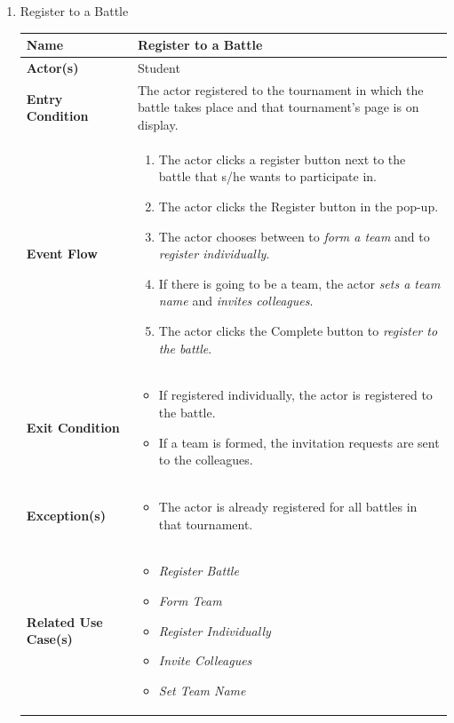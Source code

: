 \begin{enumerate}
\item Register to a Battle
\begin{center}
    \begin{tabular}{ | m{10em} | m{10cm}| } 
      \hline
      \textbf{Name} & Register to a Battle  \\ 
      \hline
      \textbf{Actor(s)} & Student \\ 
      \hline
      \textbf{Entry Condition} & The actor registered to the tournament in which the battle takes place and that tournament's page is on display. \\ 
      \hline
      \textbf{Event Flow} & 
          \begin{enumerate}[(1)]
              \item The actor clicks a register button next to the battle that s/he wants to participate in.
              \item The actor clicks the Register button in the pop-up.
              \item The actor chooses between to \textit{form a team} and to \textit{register individually}. 
              \item If there is going to be a team, the actor \textit{sets a team name} and \textit{invites colleagues}.
              \item The actor clicks the Complete button to \textit{register to the battle}.
          \end{enumerate}
      \\ 
      \hline
      \textbf{Exit Condition} & 
      \begin{itemize}
          \item If registered individually, the actor is registered to the battle.
          \item If a team is formed, the invitation requests are sent to the colleagues.
      \end{itemize}
        \\ 
      \hline
      \textbf{Exception(s)} & 
      \begin{itemize}
          \item The actor is already registered for all battles in that tournament.
      \end{itemize}
          \\ 
      \hline
      \textbf{Related Use Case(s)} & 
      \begin{itemize}
          \item \textit{Register Battle}
          \item \textit{Form Team}
          \item \textit{Register Individually}
          \item \textit{Invite Colleagues}
          \item \textit{Set Team Name}
      \end{itemize}
          \\ 
      \hline
    \end{tabular}
        \label{tbl:uc11}
\end{center}



\end{enumerate}
